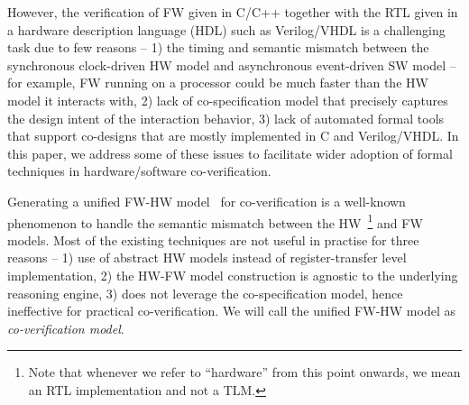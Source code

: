 \documentclass[sigconf]{acmart}
\begin{document}
However, the verification of FW given in C/C++ together with the RTL given in a hardware
description language (HDL) such as Verilog/VHDL is a challenging task due to 
few reasons -- 1) the timing and semantic mismatch between the synchronous
clock-driven HW model and asynchronous event-driven SW model -- for example,
FW running on a processor could be much faster than the HW
model it interacts with, 2) lack of co-specification model that precisely
captures the design intent of the interaction behavior, 3) lack of automated
formal tools that support co-designs that are mostly implemented in C and 
Verilog/VHDL.   In this paper, we address some of these issues to facilitate 
wider adoption of formal techniques in hardware/software co-verification.   


Generating a unified FW-HW model~\cite{fmsd02,emsoft07,fase10} for 
co-verification is a well-known phenomenon to handle the semantic mismatch 
between the HW~\footnote{Note that whenever we refer to ``hardware'' from this point onwards, we mean an RTL implementation 
and not a TLM.}  and FW models.  Most of the existing techniques are not 
useful in practise for three reasons -- 1) use of abstract HW models 
instead of register-transfer level implementation, 2) the HW-FW model
construction is agnostic to the underlying reasoning engine, 3) does not
leverage the co-specification model, hence ineffective for practical
co-verification.  We will call the unified FW-HW model as \emph{co-verification model}.  
\end{document}
